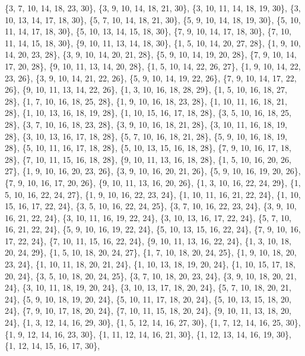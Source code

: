 \documentclass[11pt,a4paper]{article}
\begin{document}
{\{3, 7, 10, 14, 18, 23, 30\}, \{3, 9, 10, 14, 18, 21, 30\}, \{3, 10, 11, 14, 18, 19, 30\}, \{3, 10, 13, 14, 17, 18, 30\}, \{5, 7, 10, 14, 18, 21, 30\},
\{5, 9, 10, 14, 18, 19, 30\}, \{5, 10, 11, 14, 17, 18, 30\}, \{5, 10, 13, 14, 15, 18, 30\}, \{7, 9, 10, 14, 17, 18, 30\}, \{7, 10, 11, 14, 15, 18, 30\},
\{9, 10, 11, 13, 14, 18, 30\}, \{1, 5, 10, 14, 20, 27, 28\}, \{1, 9, 10, 14, 20, 23, 28\}, \{3, 9, 10, 14, 20, 21, 28\}, \{5, 9, 10, 14, 19, 20, 28\},
\{7, 9, 10, 14, 17, 20, 28\}, \{9, 10, 11, 13, 14, 20, 28\}, \{1, 5, 10, 14, 22, 26, 27\}, \{1, 9, 10, 14, 22, 23, 26\}, \{3, 9, 10, 14, 21, 22, 26\},
\{5, 9, 10, 14, 19, 22, 26\}, \{7, 9, 10, 14, 17, 22, 26\}, \{9, 10, 11, 13, 14, 22, 26\}, \{1, 3, 10, 16, 18, 28, 29\}, \{1, 5, 10, 16, 18, 27, 28\},
\{1, 7, 10, 16, 18, 25, 28\}, \{1, 9, 10, 16, 18, 23, 28\}, \{1, 10, 11, 16, 18, 21, 28\}, \{1, 10, 13, 16, 18, 19, 28\}, \{1, 10, 15, 16, 17, 18, 28\},
\{3, 5, 10, 16, 18, 25, 28\}, \{3, 7, 10, 16, 18, 23, 28\}, \{3, 9, 10, 16, 18, 21, 28\}, \{3, 10, 11, 16, 18, 19, 28\}, \{3, 10, 13, 16, 17, 18, 28\},
\{5, 7, 10, 16, 18, 21, 28\}, \{5, 9, 10, 16, 18, 19, 28\}, \{5, 10, 11, 16, 17, 18, 28\}, \{5, 10, 13, 15, 16, 18, 28\}, \{7, 9, 10, 16, 17, 18, 28\},
\{7, 10, 11, 15, 16, 18, 28\}, \{9, 10, 11, 13, 16, 18, 28\}, \{1, 5, 10, 16, 20, 26, 27\}, \{1, 9, 10, 16, 20, 23, 26\}, \{3, 9, 10, 16, 20, 21, 26\},
\{5, 9, 10, 16, 19, 20, 26\}, \{7, 9, 10, 16, 17, 20, 26\}, \{9, 10, 11, 13, 16, 20, 26\}, \{1, 3, 10, 16, 22, 24, 29\}, \{1, 5, 10, 16, 22, 24, 27\},
\{1, 9, 10, 16, 22, 23, 24\}, \{1, 10, 11, 16, 21, 22, 24\}, \{1, 10, 15, 16, 17, 22, 24\}, \{3, 5, 10, 16, 22, 24, 25\}, \{3, 7, 10, 16, 22, 23, 24\},
\{3, 9, 10, 16, 21, 22, 24\}, \{3, 10, 11, 16, 19, 22, 24\}, \{3, 10, 13, 16, 17, 22, 24\}, \{5, 7, 10, 16, 21, 22, 24\}, \{5, 9, 10, 16, 19, 22, 24\},
\{5, 10, 13, 15, 16, 22, 24\}, \{7, 9, 10, 16, 17, 22, 24\}, \{7, 10, 11, 15, 16, 22, 24\}, \{9, 10, 11, 13, 16, 22, 24\}, \{1, 3, 10, 18, 20, 24, 29\},
\{1, 5, 10, 18, 20, 24, 27\}, \{1, 7, 10, 18, 20, 24, 25\}, \{1, 9, 10, 18, 20, 23, 24\}, \{1, 10, 11, 18, 20, 21, 24\}, \{1, 10, 13, 18, 19, 20, 24\},
\{1, 10, 15, 17, 18, 20, 24\}, \{3, 5, 10, 18, 20, 24, 25\}, \{3, 7, 10, 18, 20, 23, 24\}, \{3, 9, 10, 18, 20, 21, 24\}, \{3, 10, 11, 18, 19, 20, 24\},
\{3, 10, 13, 17, 18, 20, 24\}, \{5, 7, 10, 18, 20, 21, 24\}, \{5, 9, 10, 18, 19, 20, 24\}, \{5, 10, 11, 17, 18, 20, 24\}, \{5, 10, 13, 15, 18, 20, 24\},
\{7, 9, 10, 17, 18, 20, 24\}, \{7, 10, 11, 15, 18, 20, 24\}, \{9, 10, 11, 13, 18, 20, 24\}, \{1, 3, 12, 14, 16, 29, 30\}, \{1, 5, 12, 14, 16, 27, 30\},
\{1, 7, 12, 14, 16, 25, 30\}, \{1, 9, 12, 14, 16, 23, 30\}, \{1, 11, 12, 14, 16, 21, 30\}, \{1, 12, 13, 14, 16, 19, 30\}, \{1, 12, 14, 15, 16, 17, 30\},
}
\end{document}
